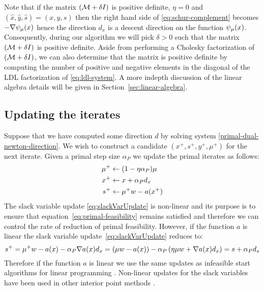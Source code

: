 \documentclass{article}
\begin{document}
Note that if the matrix $(\mathcal{M} + \delta I)$ is positive definite, $\eta = 0$ and $(\hat{x},\hat{y},\hat{s}) = (x,y,s)$ then the right hand side of \eqref{eq:schur-complement} becomes $-\nabla \psi_{\mu}(x)$ hence the direction $d_{x}$ is a descent direction on the function $\psi_{\mu}(x)$. Consequently, during our algorithm we will pick $\delta > 0$ such that  the matrix $(\mathcal{M} + \delta I)$ is positive definite. Aside from performing a Cholesky factorization of $(\mathcal{M} + \delta I)$, we can also determine that the matrix is positive definite by computing the number of positive and negative elements in the diagonal of the LDL factorization of \eqref{eq:ldl-system}. A more indepth discussion of the linear algebra details will be given in Section~\ref{sec:linear-algebra}.



\subsection{Updating the iterates}

Suppose that we have computed some direction $d$ by solving system \eqref{primal-dual-newton-direction}. We wish to construct a candidate $(x^{+}, s^{+}, y^{+}, \mu^{+})$ for the next iterate.
Given a primal step size $\alpha_{P}$ we update the primal iterates as follows:
\begin{subequations}\label{eq:iterate-update}
\begin{flalign}
\mu^{+} &\gets (1 - \eta \alpha_{P}) \mu \\
x^{+} &\gets x + \alpha_{P} d_{x} \label{eq:xVarUpdate} \\
s^{+} &\gets \mu^{+} w - a(x^{+}) \label{eq:slackVarUpdate}
\end{flalign}
\end{subequations}
The slack variable update \eqref{eq:slackVarUpdate} is non-linear and its purpose is to ensure that equation~\eqref{eq:primal-feasibility} remains satisfied and therefore we can control the rate of reduction of primal feasibility. However, if the function $a$ is linear the slack variable update~\eqref{eq:slackVarUpdate} reduces to:
$$
s^{+} = \mu^{+} w - a(x) - \alpha_{P} \nabla a(x)  d_{x} = \left(\mu w - a(x) \right) -  \alpha_{P}  \left( \eta \mu w + \nabla a(x)  d_{x} \right) = s + \alpha_{P} d_{s}
$$
Therefore if the function $a$ is linear we use the same updates as infeasible start algorithms for linear programming \cite{lustig1990feasibility,mehrotra1992implementation}. Non-linear updates for the slack variables have been used in other interior point methods \cite{andersen1998computational, curtis2012penalty}.
\end{document}
